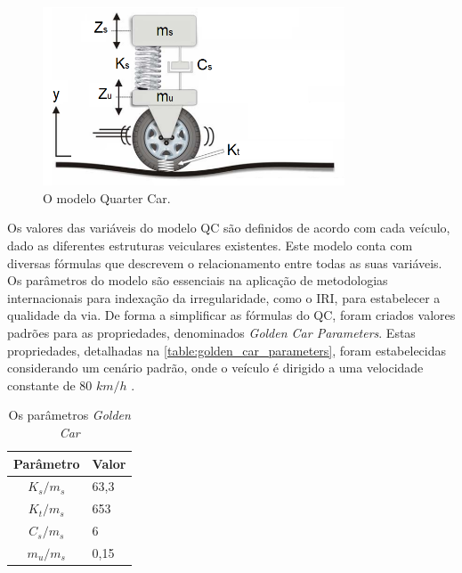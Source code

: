 \begin{figure}[h]
  \centering
  \caption{O modelo Quarter Car.}
   \label{fig:quarter_car}
   \includegraphics[width=0.8\textwidth]{figuras/fig_4.png}
\end{figure}

Os valores das variáveis do modelo QC são definidos de acordo com cada veículo, dado as diferentes estruturas veiculares existentes. Este modelo conta com diversas fórmulas que descrevem o relacionamento entre todas as suas variáveis. Os parâmetros do modelo são essenciais na aplicação de metodologias internacionais para indexação da irregularidade, como o IRI, para estabelecer a qualidade da via. De forma a simplificar as fórmulas do QC, foram criados valores padrões para as propriedades, denominados \textit{Golden Car Parameters}. Estas propriedades, detalhadas na \autoref{table:golden_car_parameters}, foram estabelecidas considerando um cenário padrão, onde o veículo é dirigido a uma velocidade constante de 80 $km/h$ \cite{Loizos2008}.

\begin{table}[h]
    \caption{Os parâmetros \textit{Golden Car}}
    \label{table:golden_car_parameters}
    \centering
    \small
    \begin{tabular}{cl}
        \toprule
        \textbf{Parâmetro} & \textbf{Valor} \\
        \toprule
        $K_s/m_s$ & 63,3 \\
        \midrule
        $K_t/m_s$ & 653 \\
        \midrule
        $C_s/m_s$ & 6 \\
        \midrule
        $m_u/m_s$ & 0,15 \\
        \bottomrule
    \end{tabular}
\end{table}

